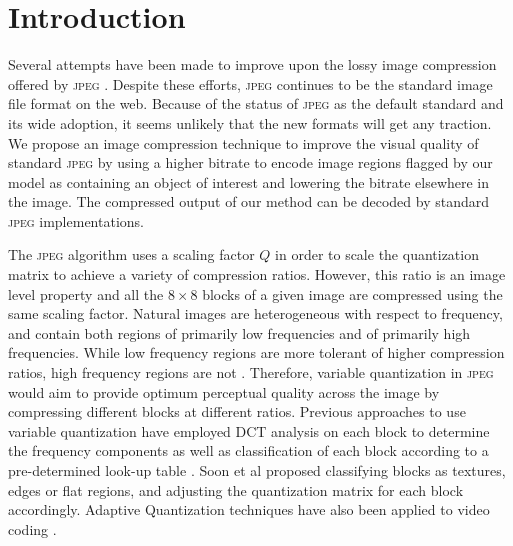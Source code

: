 \section{Introduction}
Several attempts have been made to improve upon the lossy image compression offered by \textsc{jpeg} \cite{ginesu2012objective} \cite{toderici2016full}.
Despite these efforts, \textsc{jpeg} continues to be the standard image file format on the web.
Because of the status of \textsc{jpeg} as the default standard and its wide adoption, it seems unlikely that the new formats will get any traction.
We propose an image compression technique to improve the visual quality of standard \textsc{jpeg} by using a higher bitrate to encode image regions flagged by our model as containing an object of interest and lowering the bitrate elsewhere in the image.
The compressed output of our method can be decoded by standard \textsc{jpeg} implementations.

The \textsc{jpeg} algorithm uses a scaling factor $Q$ in order to scale the quantization matrix to achieve a variety of compression ratios.
However, this ratio is an image level property and all the $8 \times 8$ blocks of a given image are compressed using the same scaling factor.
Natural images are heterogeneous with respect to frequency, and contain both regions of primarily low frequencies and of primarily high frequencies.
While low frequency regions are more tolerant of higher compression ratios, high frequency regions are not \cite{chandra1999jpegcompressionme}.
Therefore, variable quantization in \textsc{jpeg} would aim to provide optimum perceptual quality across the image by compressing different blocks at different ratios.
Previous approaches to use variable quantization have employed DCT analysis on each block to determine the frequency components \cite{konstantinides1998method} as well as classification of each block according to a pre-determined look-up table \cite{memon2000method}.
Soon et al \cite{tan1996classified} proposed classifying blocks as textures, edges or flat regions, and adjusting the quantization matrix for each block accordingly.
Adaptive Quantization techniques have also been applied to video coding \cite{xiang2014adaptive}.

